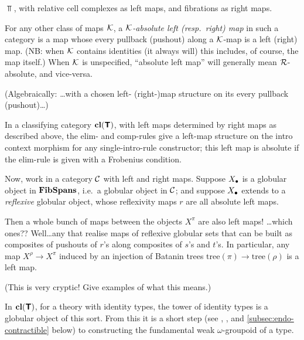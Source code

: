 \documentclass{amsart}
\newcommand{\tree}{\mathrm{tree}}
\begin{document}
\begin{example}$\Top$, with relative cell complexes as left maps, and fibrations as right maps.
\end{example}

\begin{definition}For any other class of maps $\mathcal{K}$, a \emph{$\mathcal{K}$-absolute left (resp.\ right) map} in such a category is a map whose every pullback (pushout) along a $\mathcal{K}$-map is a left (right) map.  (NB: when $\mathcal{K}$ contains identities (it always will) this includes, of course, the map itself.)  When $\mathcal{K}$ is unspecified, ``absolute left map'' will generally mean $\mathcal{R}$-absolute, and vice-versa.

(Algebraically: \ldots with a chosen left- (right-)map structure on its every pullback (pushout)\ldots)  
\end{definition}

\begin{example}In a classifying category $\mathbf{cl}(\textbf{\textsf{T}})$, with left maps determined by right maps as described above, the elim- and comp-rules give a left-map structure on the intro context morphism for any single-intro-rule constructor; this left map is absolute if the elim-rule is given with a Frobenius condition.
\end{example}

Now, work in a category $\mathcal{C}$ with left and right maps.  Suppose $X_\bullet$ is a globular object in $\mathbf{FibSpans}$, i.e.\ a globular object in $\mathcal{C}$; and suppose $X_\bullet$ extends to a \emph{reflexive} globular object, whose reflexivity maps $r$ are all absolute left maps.

Then a whole bunch of maps between the objects $X^\pi$ are also left maps!  \ldots which ones??  Well\ldots any that realise maps of reflexive globular sets that can be built as composites of pushouts of $r$'s along composites of $s$'s and $t$'s.  In particular, any map $X^\rho \to X^\pi$ induced by an injection of Batanin trees $\tree(\pi) \to \tree(\rho)$ is a left map.

(This is very cryptic!  Give examples of what this means.)

\begin{example}
In $\mathbf{cl}(\textbf{\textsf{T}})$, for a theory with identity types, the tower of identity types is a globular object of this sort.  From this it is a short step (see \cite{lumsdaine:tlca-journal}, \cite{garner-van-den-berg}, and \ref{subsec:endo-contractible} below) to constructing the fundamental weak $\omega$-groupoid of a type.
\end{example}
\end{document}
